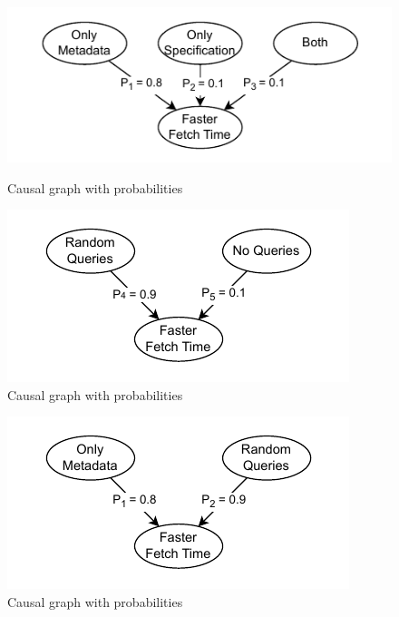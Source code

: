 \begin{figure}[!h]
    \begin{minipage}{0.48\textwidth}
        \centering
        \includegraphics[width=0.9\linewidth]{assets/pdf/evaluation/dag-tmp-meta}
        \caption{Causal graph with probabilities}
        \label{fig:dag-tmp-metadata}
    \end{minipage}\hfill
    \begin{minipage}{0.48\textwidth}
        \centering
        \includegraphics[width=0.8\linewidth]{assets/pdf/evaluation/dag-tmp-random}
        \caption{Causal graph with probabilities}
        \label{fig:dag-tmp-random}
    \end{minipage}

    \label{fig:dag-comparison}
\end{figure}

\begin{figure}[!h]
    \begin{center}
        \includegraphics[width=0.4\linewidth]{assets/pdf/evaluation/dag-retrieval}
    \end{center}

    \caption{Causal graph with probabilities}
    \label{fig:dag-retrieval}
\end{figure}

